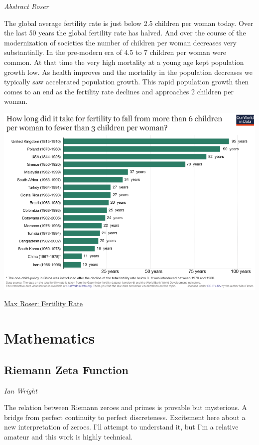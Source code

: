 \documentclass[
]{book}
\begin{document}
\emph{Abstract Roser}

The global average fertility rate is just below 2.5 children per woman today. Over the last 50 years the global fertility rate has halved. And over the course of the modernization of societies the number of children per woman decreases very substantially. In the pre-modern era of 4.5 to 7 children per woman were common. At that time the very high mortality at a young age kept population growth low. As health improves and the mortality in the population decreases we typically saw accelerated population growth. This rapid population growth then comes to an end as the fertility rate declines and approaches 2 children per woman.

\includegraphics{fig/fertility_fall_countries.png}

\href{https://ourworldindata.org/fertility-rate}{Max Roser: Fertility Rate}

\hypertarget{mathematics}{%
\chapter{Mathematics}\label{mathematics}}

\hypertarget{riemann-zeta-function}{%
\section{Riemann Zeta Function}\label{riemann-zeta-function}}

\emph{Ian Wright}

The relation between Riemann zeroes and primes is provable but mysterious. A bridge from perfect continuity to perfect discreteness. Excitement here about a new interpretation of zeroes. I'll attempt to understand it, but I'm a relative amateur and this work is highly technical.
\end{document}
